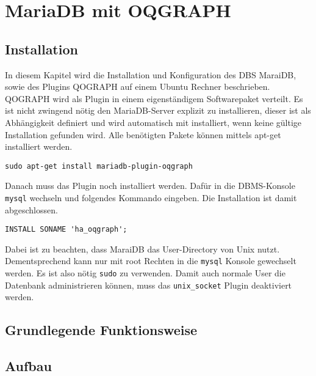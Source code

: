 \setcounter{chapter}{2}

\section{MariaDB mit OQGRAPH} %
\subsection{Installation}
In diesem Kapitel wird die Installation und Konfiguration des DBS MaraiDB, sowie des Plugins QOGRAPH auf einem Ubuntu Rechner beschrieben.  
QOGRAPH wird als Plugin in einem eigenständigem Softwarepaket verteilt. Es ist nicht zwingend nötig den MariaDB-Server explizit zu installieren, dieser ist als Abhängigkeit definiert und wird automatisch mit installiert, wenn keine gültige Installation gefunden wird. Alle benötigten Pakete können mittels apt-get installiert werden.
\begin{lstlisting}
sudo apt-get install mariadb-plugin-oqgraph
\end{lstlisting}
Danach muss das Plugin noch installiert werden. Dafür in die DBMS-Konsole \texttt{mysql} wechseln und folgendes Kommando eingeben. Die Installation ist damit abgeschlossen.
\begin{lstlisting}
INSTALL SONAME 'ha_oqgraph';
\end{lstlisting}

Dabei ist zu beachten, dass MaraiDB das User-Directory von Unix nutzt. Dementsprechend kann nur mit root Rechten in die \texttt{mysql} Konsole  gewechselt werden. Es ist also nötig \texttt{sudo} zu verwenden. Damit auch normale User die Datenbank administrieren können, muss das \texttt{unix\_socket} Plugin deaktiviert werden.

\subsection{Grundlegende Funktionsweise}
\subsection{Aufbau}
